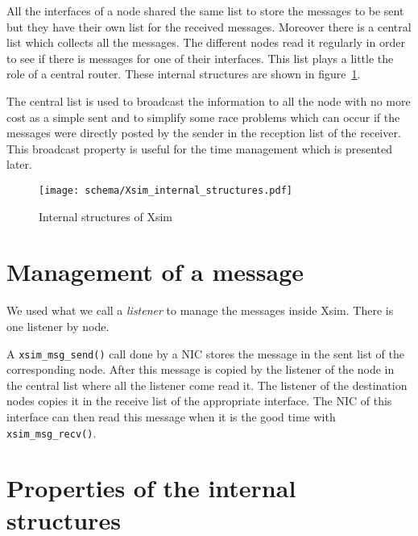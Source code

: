 All the interfaces of
a node shared the same list to store the messages to be sent but they have their
own list for the received messages. Moreover there is a central list which 
collects all the messages. The different nodes read it regularly in order to 
see if there is messages for one of their interfaces. This list plays a little 
the role of a central router.
These internal structures are shown in figure~\ref{Xsim_internal_structures}.

The central list is used to broadcast the information to all the node with no
more cost as a simple sent and to simplify some race problems which can occur
if the messages were directly posted by the sender in the reception list of
the receiver. This broadcast property is useful for the time management which
is presented later.

\begin{figure}[h]
\begin{center}
    \texttt{[image: schema/Xsim\_internal\_structures.pdf]}
	\caption{Internal structures of Xsim}
	\label{Xsim_internal_structures}
\end{center}
\end{figure}


\section{Management of a message}

We used what we call a \emph{listener} to manage the messages inside Xsim.
There is one listener by node.

A \verb|xsim_msg_send()| call done by a NIC stores the message in the sent list of the 
corresponding node. After this message is copied by the listener of the node 
in the central list where all the listener come read it. The listener of the 
destination nodes copies it in the receive list of the appropriate interface. 
The NIC of this interface can then read this message when it is the good time
with \verb|xsim_msg_recv()|.




\section{Properties of the internal structures}


